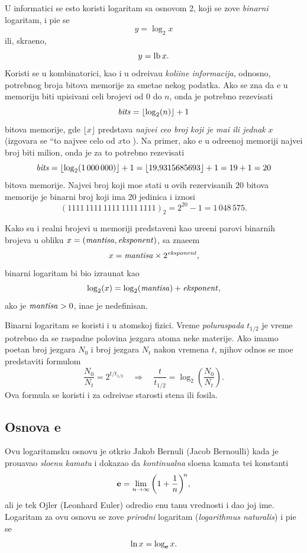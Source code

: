 \documentclass[12pt, twoside, a4paper]{article}
\def\navod#1{\leavevmode\setbox\qqbox\hbox{``}\hbox to \wd\qqbox{,\hss,}#1\hbox to \wd\qqbox{`\hss`}}
\def\logtwo{\log_2}
\def\puta{\times}
\def\.{\smash{,}\vphantom{.}}
\def\e{{\bf e}}
\def\th{t_{1/2}}
\def\sledi{{\quad\Rightarrow\quad}}
\begin{document}
U informatici se {\cv}esto koristi logaritam sa osnovom 2, koji se zove {\sl binarni\/} logaritam,
i pi{\sv}e se
$$
y=\logtwo x
$$
ili, skra{\cc}eno,
$$
y=\mathop{\rm lb} x.
$$
Koristi se u kombinatorici, kao i u odre{\dj}iva{\nj}u {\sl koli{\cv}ine informacija},
odnosno, potrebnog broja bitova me\-mo\-ri\-je za sme{\sv}ta{\nj}e nekog podatka.
Ako se zna da {\cc}e u me\-mo\-ri\-ju biti upisivani celi brojevi od 0 do $n$, onda je potrebno rezevisati
\begin{equation}\label{eq:bits}
  \bits = \lfloor\logtwo(n)\rfloor+1
\end{equation}
bitova memorije, gde $\lfloor x\rfloor$ predstav{\lj}a {\sl najve{\cc}i ceo broj koji je ma{\nj}i ili jednak} $x$
(izgovara se \navod{najve{\cc}e celo od $x$}). 
Na primer, ako {\cc}e u odre{\dj}enoj memoriji najve{\cc}i 
broj biti milion, onda je za to potrebno rezevisati
$$
\bits=\lfloor\logtwo(1\,000\,000)\rfloor+1=\lfloor 19\.9315685693\rfloor+1 = 19+1=20
$$
bitova memorije. Najve{\cc}i broj koji mo{\zv}e stati u ovih rezervisanih 20 bitova memorije je binarni broj koji ima 20 jedinica
i iznosi 
$$
(1111\,1111\,1111\,1111\,1111)_2=
2^{20}-1=1\,048\,575.
$$

Kako su i realni brojevi u memoriji predstav{\lj}eni kao ure{\dj}eni parovi binarnih brojeva u obliku
$x=({\it mantisa},{\it eksponent})$, sa zna{\cv}e{\nj}em
$$
x=\mant\puta2^\expo,
$$
binarni logaritam bi bio izra{\cv}unat kao
$$
\logtwo(x)=\logtwo(\mant)+\expo,
$$
ako je ${\it mantisa}>0$, ina{\cv}e je nedefinisan.

\smallskip

Binarni logaritam se koristi i u atomskoj fizici.
Vreme {\sl poluraspada\/} $\th$ je vreme potrebno da se raspadne polovina jezgara atoma neke materije. 
Ako imamo po{\cv}etan broj jezgara $N_0$ i broj jezgara $N_t$ nakon vremena $t$, njihov odnos
se mo{\zv}e pred\-sta\-vi\-ti formulom
\begin{equation}
\label{eq:halftime}
\frac{N_0}{N_t}=2^{t/\th}\sledi \frac{t}{\th}=\logtwo\left( \frac{N_0}{N_t} \right).
\end{equation}
Ova formula se koristi i za odre{\dj}iva{\nj}e starosti stena ili fosila.



\subsection{Osnova \e}

Ovu logaritamsku osnovu je otkrio Jakob Bernuli (Jacob Bernoulli) kada je
prou{\cv}avao {\sl slo{\zv}enu kamatu\/} i dokazao da {\sl kontinualna\/} slo{\zv}ena kamata
te{\zv}i konstanti
$$
\e=\lim_{n\to\infty}\left(1+\frac1n\right)^{\!n}\!,
$$
ali je tek Ojler (Leonhard Euler)
odredio {\nj}enu ta{\cv}nu vrednosti i dao joj ime.
Logaritam za ovu osnovu se zove {\sl prirodni\/} logaritam ({\sl logarithmus naturalis\/})
i pi{\sv}e se
$$
\ln x=\log_\e x.
$$
\end{document}
